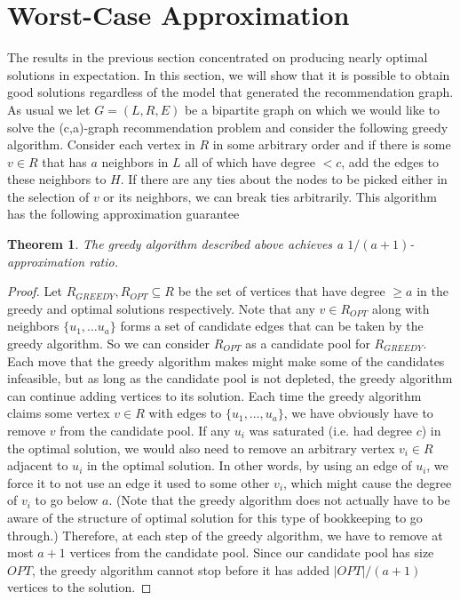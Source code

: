 \documentclass[]{article}
\newtheorem{thm}{Theorem}
\begin{document}
\section{Worst-Case Approximation}
The results in the previous section concentrated on producing nearly
optimal solutions in expectation. In this section, we will show that
it is possible to obtain good solutions regardless of the model that
generated the recommendation graph. As usual we let $G=(L,R,E)$ be a
bipartite graph on which we would like to solve the (c,a)-graph
recommendation problem and consider the following greedy
algorithm. Consider each vertex in $R$ in some arbitrary order and if
there is some $v \in R$ that has $a$ neighbors in $L$ all of which
have degree $< c$, add the edges to these neighbors to $H$. If there
are any ties about the nodes to be picked either in the selection of
$v$ or its neighbors, we can break ties arbitrarily. This algorithm
has the following approximation guarantee

\begin{thm}
The greedy algorithm described above achieves a $1/(a+1)$-approximation ratio.
\end{thm}
\begin{proof}
Let $R_{GREEDY}, R_{OPT}\subseteq R$ be the set of vertices that have
degree $\geq a$ in the greedy and optimal solutions respectively. Note
that any $v \in R_{OPT}$ along with neighbors $\{u_1,\ldots u_a\}$
forms a set of candidate edges that can be taken by the greedy
algorithm. So we can consider $R_{OPT}$ as a candidate pool for
$R_{GREEDY}$. Each move that the greedy algorithm makes might make
some of the candidates infeasible, but as long as the candidate pool
is not depleted, the greedy algorithm can continue adding vertices to
its solution. Each time the greedy algorithm claims some vertex $v\in
R$ with edges to $\{u_1,\ldots, u_a\}$, we have obviously have to
remove $v$ from the candidate pool. If any $u_i$ was saturated
(i.e. had degree $c$) in the optimal solution, we would also need to
remove an arbitrary vertex $v_i\in R$ adjacent to $u_i$ in the optimal
solution. In other words, by using an edge of $u_i$, we force it to
not use an edge it used to some other $v_i$, which might cause the
degree of $v_i$ to go below $a$. (Note that the greedy algorithm does
not actually have to be aware of the structure of optimal solution for
this type of bookkeeping to go through.) Therefore, at each step of
the greedy algorithm, we have to remove at most $a+1$ vertices from
the candidate pool. Since our candidate pool has size $OPT$, the
greedy algorithm cannot stop before it has added $|OPT|/(a+1)$
vertices to the solution.
\end{proof}
\end{document}
